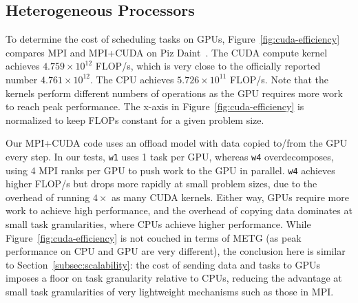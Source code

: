 \subsection{Heterogeneous Processors}



To determine the cost of scheduling tasks on GPUs, Figure~\ref{fig:cuda-efficiency} compares MPI
and MPI+CUDA on Piz Daint~\cite{PizDaint}. The CUDA
compute kernel achieves $4.759 \times 10^{12}$
FLOP/s, which is very close to the officially reported number
$4.761 \times 10^{12}$. The CPU achieves $5.726 \times 10^{11}$
FLOP/s. Note that the kernels perform different numbers of
operations as the GPU requires more work to reach peak
performance. The x-axis in Figure~\ref{fig:cuda-efficiency} is
normalized to keep FLOPs constant for a given problem
size.

Our MPI+CUDA code uses an offload model with data copied to/from the GPU every step. In our tests, \lstinline{w1} uses 1 task per GPU, whereas
\lstinline{w4} overdecomposes, using 4 MPI
ranks per GPU to push work to the GPU in parallel.
\lstinline{w4} achieves higher FLOP/s but
drops more rapidly at small problem sizes, due to the overhead of
running $4\times$ as many CUDA kernels. Either way,
GPUs require more work to achieve high performance, and the overhead
of copying data dominates at small task
granularities, where CPUs achieve higher
performance. While Figure~\ref{fig:cuda-efficiency} is not couched in
terms of METG (as peak performance on CPU and GPU are very
different), the conclusion here is similar to
Section~\ref{subsec:scalability}: the cost of sending data and
tasks to GPUs imposes a floor on task granularity relative to CPUs, reducing the advantage at small task granularities of
very lightweight mechanisms such as those in MPI.




